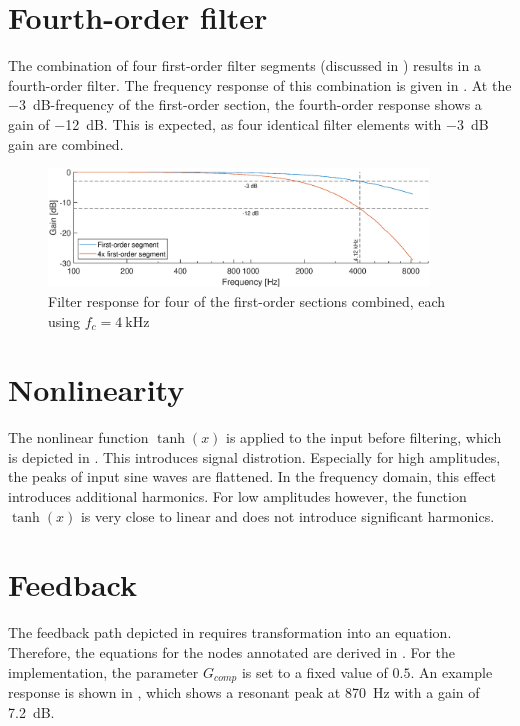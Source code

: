 \documentclass[a4paper, 12pt]{article}
\begin{document}
\section{Fourth-order filter} \label{sec:fourth-order}
The combination of four first-order filter segments (discussed in ) results in a fourth-order filter. The frequency response of this combination is given in . At the \SI{-3}{\deci\bel}-frequency of the first-order section, the fourth-order response shows a gain of \SI{-12}{\deci\bel}. This is expected, as four identical filter elements with \SI{-3}{\deci\bel} gain are combined.

\begin{figure}
	\centering
	\includegraphics[width=0.9\textwidth]{fourthorder-response.eps}
	\caption{Filter response for four of the first-order sections combined, each using $f_c = \SI{4}{\kilo\hertz}$}
	\label{fig:fourth-order-resp}
\end{figure}

\section{Nonlinearity}
The nonlinear function $\tanh(x)$ is applied to the input before filtering, which is depicted in . This introduces signal distrotion. Especially for high amplitudes, the peaks of input sine waves are flattened. In the frequency domain, this effect introduces additional harmonics. For low amplitudes however, the function $\tanh(x)$ is very close to linear and does not introduce significant harmonics.

\section{Feedback}
The feedback path depicted in  requires transformation into an equation. Therefore, the equations for the nodes annotated are derived in . For the implementation, the parameter $G_{comp}$ is set to a fixed value of $0.5$. An example response is shown in , which shows a resonant peak at \SI{870}{\hertz} with a gain of \SI{7.2}{\deci\bel}.
\end{document}
